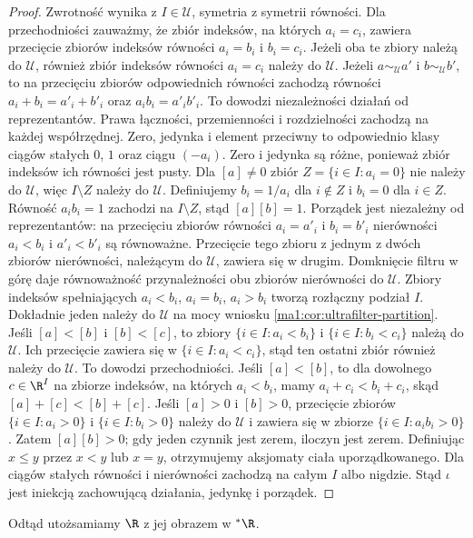\begin{proof}
Zwrotność wynika z $I\in\mathcal U$, symetria z symetrii równości. Dla przechodniości zauważmy, że zbiór indeksów, na których $a_i=c_i$, zawiera przecięcie zbiorów indeksów równości $a_i=b_i$ i $b_i=c_i$. Jeżeli oba te zbiory należą do $\mathcal U$, również zbiór indeksów równości $a_i=c_i$ należy do $\mathcal U$.
Jeżeli $a\sim_{\mathcal U}a'$ i $b\sim_{\mathcal U}b'$, to na przecięciu zbiorów odpowiednich równości zachodzą równości $a_i+b_i=a'_i+b'_i$ oraz $a_ib_i=a'_ib'_i$. To dowodzi niezależności działań od reprezentantów. Prawa łączności, przemienności i rozdzielności zachodzą na każdej współrzędnej. Zero, jedynka i element przeciwny to odpowiednio klasy ciągów stałych $0$, $1$ oraz ciągu $(-a_i)$. Zero i jedynka są różne, ponieważ zbiór indeksów ich równości jest pusty.
Dla $[a]\ne0$ zbiór $Z=\{i\in I:a_i=0\}$ nie należy do $\mathcal U$, więc $I\setminus Z$ należy do $\mathcal U$. Definiujemy $b_i=1/a_i$ dla $i\notin Z$ i $b_i=0$ dla $i\in Z$. Równość $a_ib_i=1$ zachodzi na $I\setminus Z$, stąd $[a][b]=1$.
Porządek jest niezależny od reprezentantów: na przecięciu zbiorów równości $a_i=a'_i$ i $b_i=b'_i$ nierówności $a_i<b_i$ i $a'_i<b'_i$ są równoważne. Przecięcie tego zbioru z jednym z dwóch zbiorów nierówności, należącym do $\mathcal U$, zawiera się w drugim. Domknięcie filtru w górę daje równoważność przynależności obu zbiorów nierówności do $\mathcal U$.
Zbiory indeksów spełniających $a_i<b_i$, $a_i=b_i$, $a_i>b_i$ tworzą rozłączny podział $I$. Dokładnie jeden należy do $\mathcal U$ na mocy wniosku \ref{ma1:cor:ultrafilter-partition}. Jeśli $[a]<[b]$ i $[b]<[c]$, to zbiory $\{i\in I:a_i<b_i\}$ i $\{i\in I:b_i<c_i\}$ należą do $\mathcal U$. Ich przecięcie zawiera się w $\{i\in I:a_i<c_i\}$, stąd ten ostatni zbiór również należy do $\mathcal U$. To dowodzi przechodniości. Jeśli $[a]<[b]$, to dla dowolnego $c\in\R^I$ na zbiorze indeksów, na których $a_i<b_i$, mamy $a_i+c_i<b_i+c_i$, skąd $[a]+[c]<[b]+[c]$. Jeśli $[a]>0$ i $[b]>0$, przecięcie zbiorów $\{i\in I:a_i>0\}$ i $\{i\in I:b_i>0\}$ należy do $\mathcal U$ i zawiera się w zbiorze $\{i\in I:a_ib_i>0\}$. Zatem $[a][b]>0$; gdy jeden czynnik jest zerem, iloczyn jest zerem. Definiując $x\le y$ przez $x<y$ lub $x=y$, otrzymujemy aksjomaty ciała uporządkowanego.
Dla ciągów stałych równości i nierówności zachodzą na całym $I$ albo nigdzie. Stąd $\iota$ jest iniekcją zachowującą działania, jedynkę i porządek.
\end{proof}
Odtąd utożsamiamy $\R$ z jej obrazem w $\mathord{}^*\R$.
